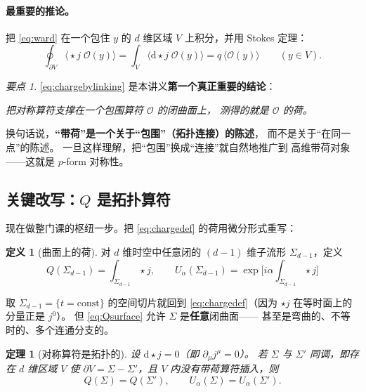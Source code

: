 \documentclass[UTF8,a4paper,11pt]{ctexart}
\theoremstyle{plain}
\newtheorem{theorem}{定理}[section]
\theoremstyle{definition}
\newtheorem{definition}{定义}[section]
\theoremstyle{remark}
\newtheorem{keypoint}{要点}[section]
\newcommand{\ext}{\mathrm{d}}          %
\newcommand{\hs}{\star}                %
\newcommand{\Op}{\mathcal{O}}
\newcommand{\Ssurf}{\Sigma}
\newcommand{\Uop}{U}
\begin{document}
\paragraph{最重要的推论。}把 \eqref{eq:ward} 在一个包住 $y$ 的
$d$ 维区域 $V$ 上积分，并用 Stokes 定理：
\begin{equation}
  \oint_{\partial V}\big\langle \hs j\;\Op(y)\big\rangle
  =\int_V \big\langle \ext\hs j\;\Op(y)\big\rangle
  = q\,\big\langle\Op(y)\big\rangle
  \qquad (y\in V).
  \label{eq:chargebylinking}
\end{equation}

\begin{keypoint}
\label{kp:measure}
\eqref{eq:chargebylinking} 是本讲义\textbf{第一个真正重要的结论}：
\begin{center}
\emph{把对称算符支撑在一个包围算符 $\Op$ 的闭曲面上，
测得的就是 $\Op$ 的荷。}
\end{center}
换句话说，\textbf{“带荷”是一个关于“包围”（拓扑连接）的陈述}，
而不是关于“在同一点”的陈述。
一旦这样理解，把“包围”换成“连接”就自然地推广到
高维带荷对象——这就是 $p$-form 对称性。
\end{keypoint}

\subsection{关键改写：\texorpdfstring{$Q$}{Q} 是拓扑算符}
\label{subsec:topological-rewrite}

现在做整门课的枢纽一步。把 \eqref{eq:chargedef} 的荷用微分形式重写：

\begin{definition}[曲面上的荷]
对 $d$ 维时空中任意闭的 $(d-1)$ 维子流形 $\Ssurf_{d-1}$，定义
\begin{equation}
  \boxed{\ Q(\Ssurf_{d-1})=\int_{\Ssurf_{d-1}}\hs j ,
  \qquad
  \Uop_\alpha(\Ssurf_{d-1})=\exp\!\Big[i\alpha\!\int_{\Ssurf_{d-1}}\hs j\Big]\ }
  \label{eq:Qsurface}
\end{equation}
\end{definition}

取 $\Ssurf_{d-1}=\{t=\text{const}\}$ 的空间切片就回到
\eqref{eq:chargedef}（因为 $\hs j$ 在等时面上的分量正是 $j^0$）。
但 \eqref{eq:Qsurface} 允许 $\Ssurf$ 是\textbf{任意}闭曲面——
甚至是弯曲的、不等时的、多个连通分支的。

\begin{theorem}[对称算符是拓扑的]
\label{thm:topological}
设 $\ext\hs j=0$（即 $\partial_\mu j^\mu=0$）。
若 $\Ssurf$ 与 $\Ssurf'$ 同调，即存在 $d$ 维区域 $V$ 使
$\partial V=\Ssurf-\Ssurf'$，且 $V$ 内没有带荷算符插入，则
\begin{equation}
  Q(\Ssurf)=Q(\Ssurf'),
  \qquad
  \Uop_\alpha(\Ssurf)=\Uop_\alpha(\Ssurf') .
  \label{eq:topological}
\end{equation}
\end{theorem}
\end{document}
